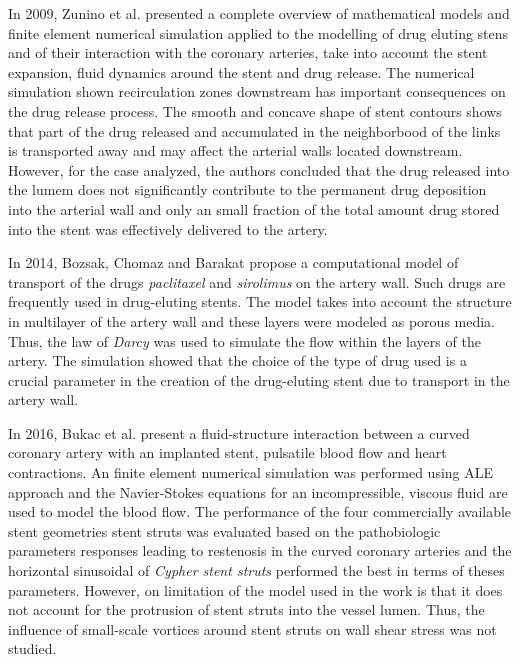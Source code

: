 \medskip
In 2009, Zunino et al. \cite{zunino2009} presented a complete overview
of mathematical models and finite element numerical simulation 
applied to the  modelling of drug eluting stens and 
of their interaction with
the coronary arteries, take into account the stent expansion,
fluid dynamics around the stent and drug release. The numerical
simulation shown recirculation zones downstream 
has important consequences on the drug release process.
The smooth and concave shape of stent contours shows that
part of the drug released and accumulated in the neighborbood
of the links is transported away and may affect the arterial
walls located downstream. However, for the case analyzed,
the authors concluded that the drug released into the lumem
does not significantly contribute to the permanent drug
deposition into the arterial wall and only an small fraction of
the total amount drug stored into the stent was effectively
delivered to the artery.


\medskip
In 2014, Bozsak, Chomaz and Barakat \cite{bozsak2014} propose a computational model of transport
of the drugs \textit{paclitaxel} and \textit{sirolimus} on the artery wall. Such drugs are
frequently used in drug-eluting stents. The model takes into account the structure in
multilayer of the artery wall and these layers were modeled as porous media.
Thus, the law of \textit{Darcy} was used to simulate the flow within the layers
of the artery. The simulation showed that the choice of the type of drug used
is a crucial parameter in the creation of the drug-eluting stent
due to transport in the artery wall.


\medskip
In 2016, Bukac et al. \cite{bukac2016} present a fluid-structure
interaction between a curved coronary artery with an implanted stent,
pulsatile blood flow and heart contractions. 
An finite element numerical simulation
was performed using ALE approach and the Navier-Stokes equations for
an incompressible, viscous fluid are used to model the blood flow.
The performance of the four commercially 
available stent geometries stent struts was evaluated based on the
pathobiologic parameters responses leading to restenosis 
in the curved coronary arteries and the horizontal sinusoidal of
\textit{Cypher stent struts} performed the best in terms of theses
parameters. However, on limitation of the model used in the work 
is that it does not account for the protrusion of stent struts into the
vessel lumen. Thus, the influence of small-scale vortices around
stent struts on wall shear stress was not studied.


